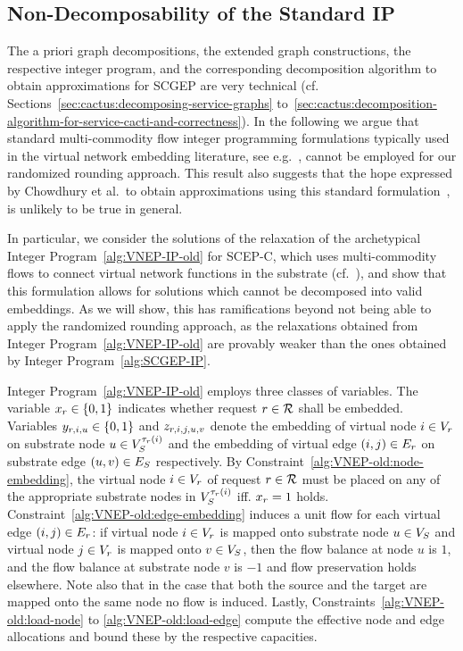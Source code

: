 \documentclass[10pt, conference, letterpaper]{IEEEtran}
\begin{document}
\subsection{Non-Decomposability of the Standard IP}
\label{sec:cactus:non-decomposability}


The a priori graph decompositions, the extended graph constructions, the respective integer program, and the corresponding decomposition algorithm to obtain approximations for SCGEP are very technical (cf. Sections~\ref{sec:cactus:decomposing-service-graphs} to~\ref{sec:cactus:decomposition-algorithm-for-service-cacti-and-correctness}). In the following we argue that standard multi-commodity flow integer programming formulations typically used in the virtual network embedding
literature, see e.g.~\cite{vnep,mehraghdam2014specifying,rostSchmidFeldmann2014}, cannot be employed for our randomized rounding approach. This result also suggests that the hope expressed by Chowdhury et al.~to obtain approximations using this standard formulation~\cite{vnep}, is unlikely to be true in general.




In particular, we consider the solutions of the relaxation of the archetypical
Integer Program~\ref{alg:VNEP-IP-old} for SCEP-C, which uses multi-commodity flows to connect virtual network functions in the substrate (cf.~\cite{vnep,mehraghdam2014specifying,rostSchmidFeldmann2014}), and show that this formulation allows for solutions which cannot be decomposed into valid embeddings. As we will show, this has ramifications beyond not being able to apply the randomized rounding approach, as the relaxations obtained from Integer Program~\ref{alg:VNEP-IP-old} are provably weaker than the ones obtained by Integer Program~\ref{alg:SCGEP-IP}.

Integer Program~\ref{alg:VNEP-IP-old} employs three classes of variables. The variable $x_{\req} \in \{0,1\}$ indicates whether request $\req \in \requests$ shall be embedded. Variables $y_{\req,i,u} \in \{0,1\}$ and $z_{\req, i,j, u,v}$ denote the embedding of virtual node $i\in \VV$ on substrate node $u \in \SVTypes[\Vtype(i)]$ and the embedding of virtual edge $(i,j) \in  \VE$ on substrate edge $(u,v) \in  \SE$ respectively.  By Constraint~\ref{alg:VNEP-old:node-embedding}, the virtual node $i \in \VV$ of request $\req \in \requests$ must be placed on any of the appropriate substrate nodes in $\SVTypes[\Vtype(i)]$ iff. $x_\req = 1$ holds. Constraint~\ref{alg:VNEP-old:edge-embedding} induces a unit flow for each virtual edge $(i,j) \in  \VE$: if virtual node $i \in \VV$ is mapped onto substrate node $u \in \SV$ and virtual node $j \in \VV$ is mapped onto $v \in \SV$, then the flow balance at node $u$ is $1$, and the flow balance at substrate node $v$ is $-1$ and flow preservation holds elsewhere. Note also that in the case that both the source and the target are mapped onto the same node no flow is induced. Lastly, Constraints~\ref{alg:VNEP-old:load-node} to \ref{alg:VNEP-old:load-edge} compute the effective node and edge allocations and bound these by the respective capacities.
\end{document}

